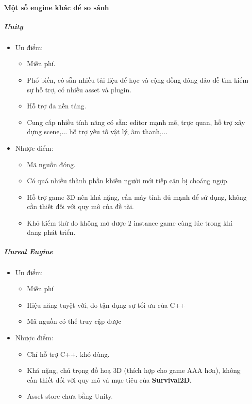 \documentclass[12pt,a4paper]{article}
\begin{document}
  \paragraph{Một số engine khác để so sánh}
  \subparagraph{Unity}
  \begin{itemize}
      \item Ưu điểm:
      \begin{itemize}
          \item Miễn phí.
          \item Phổ biến, có sẵn nhiều tài liệu để học và cộng đồng đông đảo dễ tìm kiếm sự hỗ trợ, có nhiều asset và plugin.
          \item Hỗ trợ đa nền tảng.
          \item Cung cấp nhiều tính năng có sẵn: editor mạnh mẽ, trực quan, hỗ trợ xây dựng scene,... hỗ trợ yếu tố vật lý, âm thanh,...
      \end{itemize}
      \item Nhược điểm:
      \begin{itemize}
          \item Mã nguồn đóng.
          \item Có quá nhiều thành phần khiến người mới tiếp cận bị choáng ngợp.
          \item Hỗ trợ game 3D nên khá nặng, cần máy tính đủ mạnh để sử dụng, không cần thiết đối với quy mô của đề tài.
          \item Khó kiểm thử do không mở được 2 instance game cùng lúc trong khi đang phát triển.
      \end{itemize}
  \end{itemize}
  \subparagraph{Unreal Engine}
  \begin{itemize}
      \item Ưu điểm:
      \begin{itemize}
          \item Miễn phí
          \item Hiệu năng tuyệt vời, do tận dụng sự tối ưu của C++
          \item Mã nguồn có thể truy cập được
      \end{itemize}
      \item Nhược điểm:
      \begin{itemize}
          \item Chỉ hỗ trợ C++, khó dùng.
          \item Khá nặng, chú trọng đồ hoạ 3D (thích hợp cho game AAA hơn), không cần thiết đối với quy mô và mục tiêu của \textbf{Survival2D}.
          \item Asset store chưa bằng Unity.
      \end{itemize}
  \end{itemize}
\end{document}
